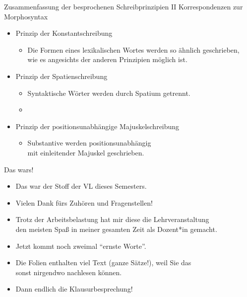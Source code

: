 \begin{frame}
  {Zusammenfassung der besprochenen Schreibprinzipien II}
  Korrespondenzen zur Morphosyntax\\
  \Zeile
  \pause
  \begin{itemize}[<+->]
    \item \alert{Prinzip der Konstantschreibung}
      \begin{itemize}[<+->]
        \item Die Formen eines lexikalischen Wortes werden so ähnlich geschrieben,\\
          wie es angesichts der anderen Prinzipien möglich ist.
      \end{itemize}
      \Zeile
    \item \alert{Prinzip der Spatienschreibung}
      \begin{itemize}[<+->]
        \item Syntaktische Wörter werden durch Spatium getrennt.
        \item {}
      \end{itemize}
      \Zeile
    \item \alert{Prinzip der positionsunabhängige Majuskelschreibung}
      \begin{itemize}[<+->]
        \item Substantive werden positionsunabhängig\\
          mit einleitender Majuskel geschrieben.
      \end{itemize}
  \end{itemize}
\end{frame}

\begin{frame}
  {Das wars!}
  \pause
  \begin{itemize}[<+->]
    \item Das war der Stoff der VL dieses Semesters.
    \item \alert{Vielen Dank fürs Zuhören und Fragenstellen!}
    \item Trotz der Arbeitsbelastung hat mir diese die Lehrveranstaltung\\
      den meisten Spaß in meiner gesamten Zeit als Dozent*in gemacht.
      \Zeile
    \item Jetzt kommt noch zweimal "`ernste Worte"'.
    \item Die Folien enthalten viel Text (ganze Sätze!), weil Sie das\\
      sonst nirgendwo nachlesen können.
      \Halbzeile
    \item Dann endlich die Klausurbesprechung!
  \end{itemize}
\end{frame}

